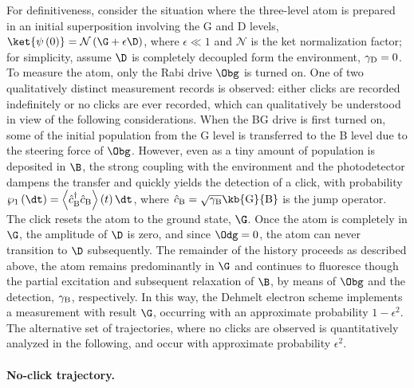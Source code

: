 For definitiveness, consider the situation where  the three-level
atom is prepared in an initial superposition involving the G and D
levels, $\ket{\psi\left(0\right)}=\mathcal{N}\left(\G+\epsilon\D\right)$,
where $\epsilon\ll1$ and $\mathcal{N}$ is the ket normalization
factor; for simplicity, assume $\D$ is completely decoupled form
the environment, $\gamma_{{\rm D}}=0$. To measure the atom, only
the Rabi drive $\Obg$ is turned on. One of two qualitatively distinct
measurement records is observed: either clicks are recorded indefinitely
or no clicks are ever recorded, which can qualitatively be understood
in view of the following considerations. When the BG drive is first
turned on, some of the initial population from the G level is transferred
to the B level due to the steering force of $\Obg$. However, even
as a tiny amount of population is deposited in $\B$, the strong coupling
with the environment and the photodetector dampens the transfer and
quickly yields the detection of a click, with probability $\wp_{1}\left(\dt\right)=\left\langle \hat{c}_{{\rm B}}^{\dagger}\hat{c}_{{\rm B}}\right\rangle \left(t\right)\dt$,
where $\hat{c}_{\mathrm{B}}=\sqrt{\gamma_{{\rm B}}}\kb{\mathrm{G}}{\mathrm{B}}$
is the  jump operator. The click resets the atom to the ground state,
$\G$. Once the atom is completely in $\G$, the amplitude of $\D$
is zero, and since $\Odg=0$, the atom can never transition to $\D$
subsequently. The remainder of the history proceeds as described above,
the atom remains predominantly in $\G$ and continues to fluoresce
though the partial excitation and subsequent relaxation of $\B$,
by means of $\Obg$ and the detection, $\gamma_{{\rm B}}$, respectively.
In this way, the Dehmelt electron scheme implements a measurement
with result $\G$, occurring with an approximate probability $1-\epsilon^{2}$.
The alternative set of trajectories, where no clicks are observed
is quantitatively analyzed in the following, and occur with approximate
probability $\epsilon^{2}$.

\paragraph{No-click trajectory. }

